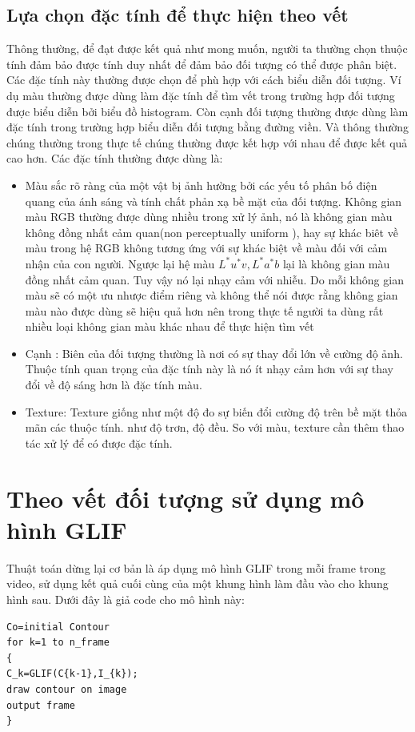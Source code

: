\documentclass[14pt,oneside,a4paper]{extreport}
\begin{document}
\subsection{Lựa chọn đặc tính để thực hiện theo vết}
Thông thường, để đạt được kết quả như mong muốn, người ta thường chọn thuộc tính đảm bảo được tính duy nhất để đảm bảo đối tượng có thể được phân biệt. Các đặc tính này thường được chọn để phù hợp với cách biểu diễn đối tượng. Ví dụ màu thường được dùng làm đặc tính để tìm vết trong trường hợp đối tượng được biểu diễn bởi biểu đồ histogram. Còn cạnh đối tượng thường được dùng làm đặc tính trong trường hợp biểu diễn đối tượng bằng đường viền. Và thông thường chúng thường trong thực tế chúng thường được kết hợp với nhau để được kết quả cao hơn. Các đặc tính thường được dùng là:
\begin{itemize}

\item Màu sắc rõ ràng của một vật bị ảnh hường bởi các yếu tố  phân bố điện quang của ánh sáng và tính chất phản xạ bề mặt của đối tượng. Không gian màu RGB thường được dùng nhiều trong xử lý ảnh, nó là không gian màu không đồng nhất cảm quan(non perceptually uniform ), hay sự khác biêt về màu trong hệ RGB không tương ứng với sự khác biệt về màu đối với cảm nhận của con người. Ngược lại hệ màu $L^*u^*v, L^*a^*b$ lại là không gian màu đồng nhất cảm quan. Tuy vậy nó lại nhạy cảm với nhiễu. Do  mỗi không gian màu sẽ có một ưu nhược điểm riêng và không thể nói được rằng không gian màu nào được dùng sẽ hiệu quả hơn nên trong thực tế người ta dùng rất nhiều loại không gian màu khác nhau để thực hiện tìm vết
\item Cạnh : Biên của đối tượng thường là nơi có sự thay đổi lớn về cường độ ảnh. Thuộc tính quan trọng của đặc tính này là nó ít nhạy cảm hơn với sự thay đổi về độ sáng hơn là đặc tính màu. 

\item Texture: Texture giống như một độ đo sự biến đổi cường độ trên bề mặt thỏa mãn các thuộc tính. như độ trơn, độ đều. So với màu, texture cần thêm thao tác xử lý để có được đặc tính. 

\end{itemize}
\section{Theo vết đối tượng sử dụng mô hình GLIF}
Thuật toán dừng lại cơ bản là áp dụng mô hình GLIF trong mỗi frame trong video, sử dụng kết quả cuối cùng của một khung hình làm đầu vào cho khung hình sau. Dưới đây là giả code cho mô hình này:
\begin{lstlisting}
Co=initial Contour
for k=1 to n_frame 
{
C_k=GLIF(C{k-1},I_{k});
draw contour on image
output frame
}

\end{lstlisting}
\end{document}

